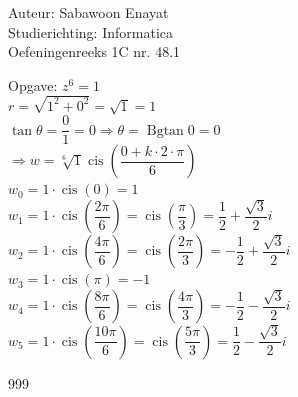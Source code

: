 \documentclass[a4paper]{article}
\begin{document}
  
\noindent \large Auteur: Sabawoon Enayat \\
\noindent \large Studierichting: Informatica\\
\noindent \large Oefeningenreeks 1C nr. 48.1\\

\newcommand{\Bgtan}{\operatorname{Bgtan}}
\newcommand{\cis}{\operatorname{cis}}

\medskip

\normalsize

Opgave: $z^6 = 1$\\

$r = \sqrt{1^2 + 0^2} = \sqrt{1} = 1$\\

$\tan \theta = \dfrac{0}{1} = 0 \Rightarrow \theta = \Bgtan 0 = 0$\\

$\Rightarrow w = \sqrt[6]{1} \cis \left(\dfrac{0 + k \cdot 2 \cdot \pi}{6}\right)$\\

$w_0 = 1 \cdot \cis \left(0\right) = 1$\\

$w_1 = 1 \cdot \cis \left(\dfrac{2\pi}{6}\right) = \cis \left(\dfrac{\pi}{3}\right) = \dfrac{1}{2} + \dfrac{\sqrt{3}}{2}i$\\

$w_2 = 1 \cdot \cis \left(\dfrac{4\pi}{6}\right) = \cis \left(\dfrac{2\pi}{3}\right) = -\dfrac{1}{2} + \dfrac{\sqrt{3}}{2}i$\\

$w_3 = 1 \cdot \cis \left(\pi\right) = -1$\\

$w_4 = 1 \cdot \cis \left(\dfrac{8\pi}{6}\right) = \cis \left(\dfrac{4\pi}{3}\right) = -\dfrac{1}{2} - \dfrac{\sqrt{3}}{2}i$\\

$w_5 = 1 \cdot \cis \left(\dfrac{10\pi}{6}\right) = \cis \left(\dfrac{5\pi}{3}\right) = \dfrac{1}{2} - \dfrac{\sqrt{3}}{2}i$\\

\begin{thebibliography}{999}
\end{thebibliography}
\end{document}
